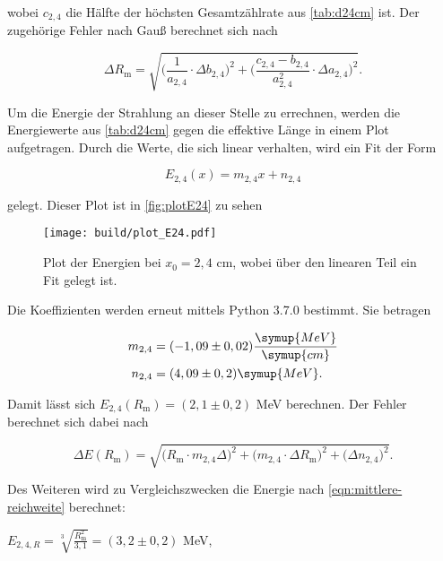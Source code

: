 wobei $c_{2,4}$ die Hälfte der höchsten Gesamtzählrate aus \autoref{tab:d24cm} ist. Der zugehörige Fehler nach Gauß berechnet sich nach

\begin{equation}
    \Delta R_\text{m} = \sqrt{\bigg(\frac{1}{a_{2,4}} \cdot \Delta b_{2,4} \bigg)^2 + \bigg( \frac{c_{2,4}-b_{2,4}}{a_{2,4}^2} \cdot \Delta a_{2,4} \bigg)^2}.
\end{equation}

Um die Energie der Strahlung an dieser Stelle zu errechnen, werden die Energiewerte aus \autoref{tab:d24cm} gegen die effektive Länge in einem Plot aufgetragen.
Durch die Werte, die sich linear verhalten, wird ein Fit der Form

\begin{equation}
    E_{2,4}(x) = m_{2,4} x + n_{2,4}
\end{equation}

gelegt. Dieser Plot ist in \autoref{fig:plotE24} zu sehen

\begin{figure}
    \centering
    \texttt{[image: build/plot\_E24.pdf]}
    \caption{Plot der Energien bei $x_0 = 2,4$ cm, wobei über den linearen Teil ein Fit gelegt ist.}
    \label{fig:plotE24}
\end{figure}

Die Koeffizienten werden erneut mittels Python 3.7.0 bestimmt. Sie betragen

\begin{align}
    m_{2,4} &= (-1,09 \pm 0,02) \frac{\symup{MeV}}{\symup{cm}}\\
    n_{2,4} &= (4,09 \pm 0,2) \symup{MeV}.
\end{align}

Damit lässt sich $E_{2,4}(R_\text{m}) = (2,1 \pm 0,2)$ MeV berechnen. Der Fehler berechnet sich dabei nach

\begin{equation}
    \Delta E(R_\text{m}) = \sqrt{\bigg( R_\text{m} \cdot m_{2,4} \Delta \bigg)^2 + \bigg(m_{2,4} \cdot \Delta R_\text{m} \bigg)^2 + \bigg( \Delta n_{2,4} \bigg)^2}.
\end{equation}

Des Weiteren wird zu Vergleichszwecken die Energie nach \eqref{eqn:mittlere-reichweite} berechnet:

\begin{center}
    $E_{2,4,R} = \sqrt[3]{\frac{R_\text{m}^2}{3,1}} = (3,2 \pm 0,2)$ MeV,
\end{center}

